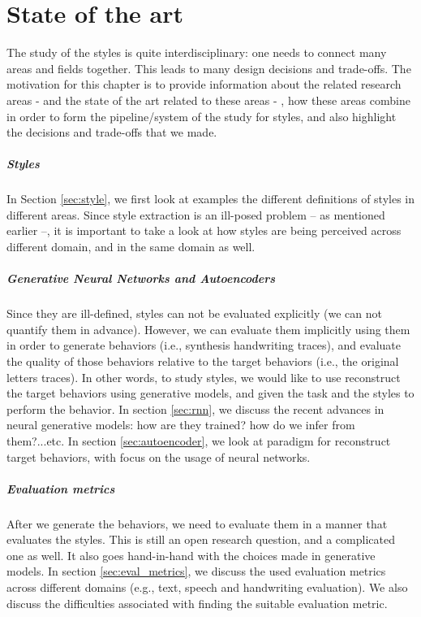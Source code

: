 \chapter{State of the art}
\label{ch:SOTA}

\par The study of the styles is quite interdisciplinary: one needs to connect many areas and fields together. This leads to many design decisions and trade-offs. The motivation for this chapter is to provide information about the related research areas - and the state of the art related to these areas - , how these areas combine in order to form the pipeline/system of the study for styles, and also highlight the decisions and trade-offs that we made.

\paragraph{Styles} In Section \ref{sec:style}, we first look at examples the different definitions of styles in different areas. Since style extraction is an ill-posed problem -- as mentioned earlier --, it is important to take a look at how styles are being perceived across different domain, and in the same domain as well.


\paragraph{Generative Neural Networks and Autoencoders} Since they are ill-defined, styles can not be evaluated explicitly (we can not quantify them in advance). However, we can evaluate them implicitly using them in order to generate behaviors (i.e., synthesis handwriting traces), and evaluate the quality of those behaviors relative to the target behaviors (i.e., the original letters traces). In other words, to study styles, we would like to use reconstruct the target behaviors using generative models, and given the task and the styles to perform the behavior. In section \ref{sec:rnn}, we discuss the recent advances in neural generative models: how are they trained? how do we infer from them?...etc. In section \ref{sec:autoencoder}, we look at paradigm for reconstruct target behaviors, with focus on the usage of neural networks.

\paragraph{Evaluation metrics} After we generate the behaviors, we need to evaluate them in a manner that evaluates the styles. This is still an open research question, and a complicated one as well. It also goes hand-in-hand with the choices made in generative models. In section \ref{sec:eval_metrics}, we discuss the used evaluation metrics across different domains (e.g., text, speech and handwriting evaluation). We also discuss the difficulties associated with finding the suitable evaluation metric.

